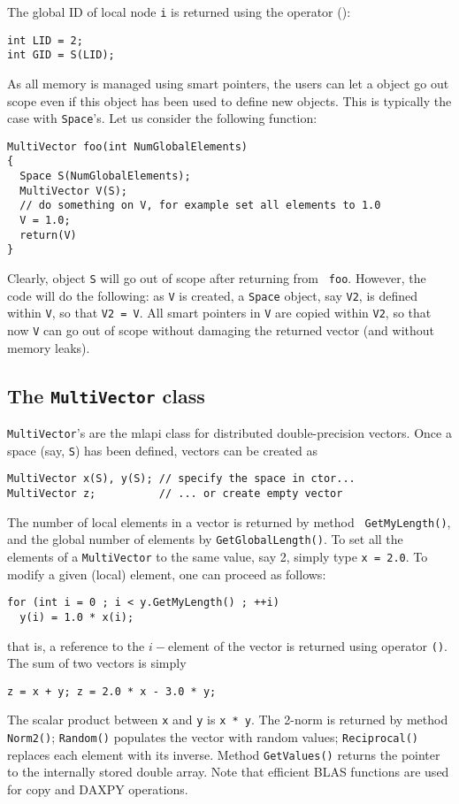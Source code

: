 \documentclass{article}[11pt]
\newcommand{\MLAPI}  {{\sc mlapi }}
\begin{document}
The global ID of local node {\tt i} is returned using the operator ():
\begin{verbatim}
int LID = 2;
int GID = S(LID);
\end{verbatim}

\smallskip

As all memory is managed using smart pointers, the users can let a object go
out scope even if this object has been used to define new objects. This is
typically the case with {\tt Space}'s. Let us consider the following function:
\begin{verbatim}
MultiVector foo(int NumGlobalElements)
{
  Space S(NumGlobalElements);
  MultiVector V(S);
  // do something on V, for example set all elements to 1.0
  V = 1.0;
  return(V)
}
\end{verbatim}
Clearly, object {\tt S} will go out of scope after returning from {\tt
  foo}. However, the code will do the following:
as {\tt V} is created, a {\tt Space} object, say {\tt V2}, is defined
within {\tt V}, so that {\tt V2 = V}. All smart pointers in {\tt V} are copied
within {\tt V2}, so that now {\tt V} can go out of scope without damaging the
returned vector (and without memory leaks).

\subsection{The {\tt MultiVector} class}
\label{sec:multivector}

{\tt MultiVector}'s are the \MLAPI class for distributed double-precision
vectors. Once a space (say, {\tt S}) has been defined, vectors can be created
as
\begin{verbatim}
MultiVector x(S), y(S); // specify the space in ctor...
MultiVector z;          // ... or create empty vector
\end{verbatim}

The number of local elements in a vector is returned by method {\tt
  GetMyLength()}, and the global number of elements by
{\tt GetGlobalLength()}. To set all the elements of a {\tt MultiVector} to the same value, say 2, simply type {\tt x = 2.0}. To modify a given (local) element, one can proceed as follows:
\begin{verbatim}
for (int i = 0 ; i < y.GetMyLength() ; ++i)
  y(i) = 1.0 * x(i);
\end{verbatim}
that is, a reference to the $i-$element of the vector is returned using
operator \verb!()!.  The sum of two vectors is simply
\begin{verbatim}
z = x + y; z = 2.0 * x - 3.0 * y; 
\end{verbatim}
The scalar product between {\tt x} and {\tt y} is {\tt x * y}. The 2-norm is
returned by method {\tt Norm2()}; {\tt Random()} populates the vector with
random values; {\tt Reciprocal()} replaces each element with its inverse. 
Method {\tt GetValues()} returns the pointer to the internally stored double
array. Note
that efficient BLAS functions are used for copy and DAXPY operations. 
\end{document}
